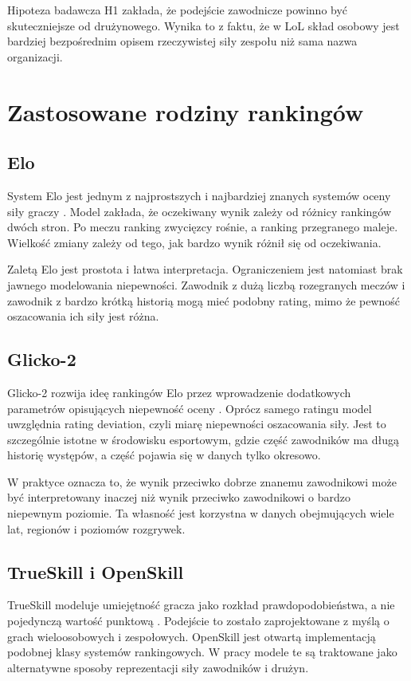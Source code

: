 Hipoteza badawcza H1 zakłada, że podejście zawodnicze powinno być skuteczniejsze od drużynowego. Wynika to z faktu, że w LoL skład osobowy jest bardziej bezpośrednim opisem rzeczywistej siły zespołu niż sama nazwa organizacji.

\section{Zastosowane rodziny rankingów}

\subsection{Elo}

System Elo jest jednym z najprostszych i najbardziej znanych systemów oceny siły graczy \parencite{elo1978}. Model zakłada, że oczekiwany wynik zależy od różnicy rankingów dwóch stron. Po meczu ranking zwycięzcy rośnie, a ranking przegranego maleje. Wielkość zmiany zależy od tego, jak bardzo wynik różnił się od oczekiwania.

Zaletą Elo jest prostota i łatwa interpretacja. Ograniczeniem jest natomiast brak jawnego modelowania niepewności. Zawodnik z dużą liczbą rozegranych meczów i zawodnik z bardzo krótką historią mogą mieć podobny rating, mimo że pewność oszacowania ich siły jest różna.

\subsection{Glicko-2}

Glicko-2 rozwija ideę rankingów Elo przez wprowadzenie dodatkowych parametrów opisujących niepewność oceny \parencite{glickman2012}. Oprócz samego ratingu model uwzględnia rating deviation, czyli miarę niepewności oszacowania siły. Jest to szczególnie istotne w środowisku esportowym, gdzie część zawodników ma długą historię występów, a część pojawia się w danych tylko okresowo.

W praktyce oznacza to, że wynik przeciwko dobrze znanemu zawodnikowi może być interpretowany inaczej niż wynik przeciwko zawodnikowi o bardzo niepewnym poziomie. Ta własność jest korzystna w danych obejmujących wiele lat, regionów i poziomów rozgrywek.

\subsection{TrueSkill i OpenSkill}

TrueSkill modeluje umiejętność gracza jako rozkład prawdopodobieństwa, a nie pojedynczą wartość punktową \parencite{trueskill2007}. Podejście to zostało zaprojektowane z myślą o grach wieloosobowych i zespołowych. OpenSkill jest otwartą implementacją podobnej klasy systemów rankingowych. W pracy modele te są traktowane jako alternatywne sposoby reprezentacji siły zawodników i drużyn.

